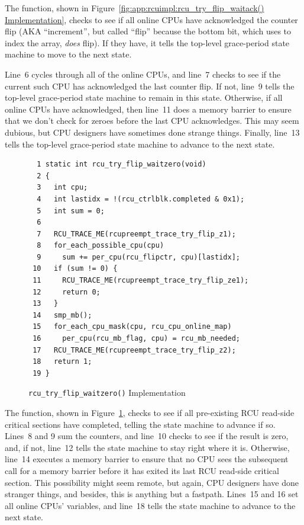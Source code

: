 The  function, shown in
Figure~\ref{fig:app:rcuimpl:rcu_try_flip_waitack() Implementation},
checks to see
if all online CPUs have acknowledged the counter flip (AKA ``increment'',
but called ``flip'' because the bottom bit, which 
uses to index the  array, \emph{does} flip).
If they have, it tells the top-level grace-period state machine to
move to the next state.

Line~6 cycles through all of the online CPUs, and line~7
checks to see if the current such CPU has acknowledged the last counter
flip.
If not, line~9 tells the top-level grace-period state machine to
remain in this state.
Otherwise, if all online CPUs have acknowledged, then line~11
does a memory barrier to ensure that we don't check for zeroes before
the last CPU acknowledges.
This may seem dubious, but CPU designers have sometimes done strange
things.
Finally, line~13 tells the top-level grace-period state machine
to advance to the next state.

\begin{figure}[tbp]
{ \scriptsize
\begin{verbatim}
  1 static int rcu_try_flip_waitzero(void)
  2 {
  3   int cpu;
  4   int lastidx = !(rcu_ctrlblk.completed & 0x1);
  5   int sum = 0;
  6
  7   RCU_TRACE_ME(rcupreempt_trace_try_flip_z1);
  8   for_each_possible_cpu(cpu)
  9     sum += per_cpu(rcu_flipctr, cpu)[lastidx];
 10   if (sum != 0) {
 11     RCU_TRACE_ME(rcupreempt_trace_try_flip_ze1);
 12     return 0;
 13   }
 14   smp_mb();
 15   for_each_cpu_mask(cpu, rcu_cpu_online_map)
 16     per_cpu(rcu_mb_flag, cpu) = rcu_mb_needed;
 17   RCU_TRACE_ME(rcupreempt_trace_try_flip_z2);
 18   return 1;
 19 }
\end{verbatim}
}
\caption{{\tt rcu\_try\_flip\_waitzero()} Implementation}
\label{fig:app:rcuimpl:rcu_try_flip_waitzero() Implementation}
\end{figure}

The  function, shown in
Figure~\ref{fig:app:rcuimpl:rcu_try_flip_waitzero() Implementation},
checks to see if
all pre-existing RCU read-side critical sections have completed,
telling the state machine to advance if so.
Lines~8 and 9 sum the counters, and line~10 checks
to see if the result is zero, and, if not, line~12 tells
the state machine to stay right where it is.
Otherwise, line~14 executes a memory barrier to ensure that
no CPU sees the subsequent call for a memory barrier before it
has exited its last RCU read-side critical section.
This possibility might seem remote, but again, CPU designers have
done stranger things, and besides, this is anything but a fastpath.
Lines~15 and 16 set all online CPUs' 
variables, and line~18 tells the state machine to advance to
the next state.

